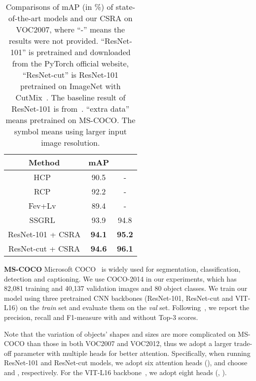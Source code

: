 \documentclass[10pt,twocolumn,letterpaper]{article}
\begin{document}
\begin{table}
	\caption{Comparisons of mAP (in \%) of state-of-the-art models and our CSRA on VOC2007, where ``-'' means the results were not provided. ``ResNet-101'' is pretrained and downloaded from the PyTorch official website, ``ResNet-cut'' is ResNet-101 pretrained on ImageNet with CutMix~\cite{cutmix}. The baseline result of ResNet-101 is from~\cite{2020_arxiv_Gaobb}. ``extra data'' means pretrained on MS-COCO. The  symbol means using larger input image resolution.}
	\label{tab:voc2007}
	\centering
	\small
	\begin{tabular}{c|cc}
		\hline
		Method                       & mAP           & \thead{mAP\extra data)} \\
		\hline\hline
		HCP~\cite{2015_PAMI_HCP}                & 90.5          & -                              \\
		RCP~\cite{2016_ICIP_RCP}                & 92.2          & -                              \\
		Fev+Lv~\cite{Fev_Lv}                    & 89.4          & -                              \\
		SSGRL~\cite{2019_ICCV_GCNre}        & 93.9          & 94.8                           \\
		\hline
		ResNet-101 + CSRA                       & \textbf{94.1} & \textbf{95.2}                  \\
		ResNet-cut + CSRA                       & \textbf{94.6} & \textbf{96.1}                  \\
		\hline
	\end{tabular}
\end{table}

\vspace{6pt}\noindent\textbf{MS-COCO} Microsoft COCO~\cite{MSCOCO} is widely used for segmentation, classification, detection and captioning. We use COCO-2014 in our experiments, which has 82,081 training and 40,137 validation images and 80 object classes. We train our model using three pretrained CNN backbones (ResNet-101, ResNet-cut and VIT-L16) on the \emph{train} set and evaluate them on the \emph{val} set. Following~\cite{2019_ICCV_GCNre,2019_CVPR_VA}, we report the precision, recall and F1-measure with and without Top-3 scores.

Note that the variation of objects' shapes and sizes are more complicated on MS-COCO than those in both VOC2007 and VOC2012, thus we adopt a larger trade-off parameter  with multiple heads for better attention. Specifically, when running ResNet-101 and ResNet-cut models, we adopt six attention heads (), and choose  and , respectively. For the VIT-L16 backbone~\cite{VIT}, we adopt eight heads (, ).
\end{document}
